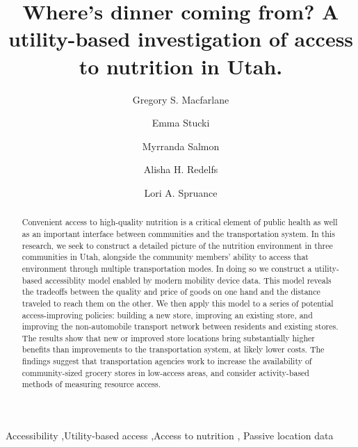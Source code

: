 \documentclass[
  letterpaper,
  number,
  review,
  3p]{elsarticle}
\begin{document}
\begin{frontmatter}
\title{Where's dinner coming from? A utility-based investigation of
access to nutrition in Utah.}
\author[1]{Gregory S. Macfarlane%
%
}
\author[1]{Emma Stucki%
%
}

\author[1]{Myrranda Salmon%
%
}

\author[2]{Alisha H. Redelfs%
%
}

\author[2]{Lori A. Spruance%
%
}








        
\begin{abstract}
Convenient access to high-quality nutrition is a critical element of
public health as well as an important interface between communities and
the transportation system. In this research, we seek to construct a
detailed picture of the nutrition environment in three communities in
Utah, alongside the community members' ability to access that
environment through multiple transportation modes. In doing so we
construct a utility-based accessiblity model enabled by modern mobility
device data. This model reveals the tradeoffs between the quality and
price of goods on one hand and the distance traveled to reach them on
the other. We then apply this model to a series of potential
access-improving policies: building a new store, improving an existing
store, and improving the non-automobile transport network between
residents and existing stores. The results show that new or improved
store locations bring substantially higher benefits than improvements to
the transportation system, at likely lower costs. The findings suggest
that transportation agencies work to increase the availability of
community-sized grocery stores in low-access areas, and consider
activity-based methods of measuring resource access.
\end{abstract}





\begin{keyword}
    Accessibility \sep Utility-based access \sep Access to
nutrition \sep 
    Passive location data
\end{keyword}
\end{frontmatter}
    
\end{document}
